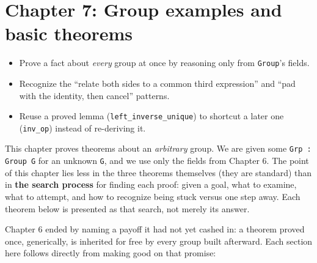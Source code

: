 \chapter{Chapter 7: Group examples and basic theorems}\label{sec:07-group-theorems:00-index:1}

\begin{learningobjectives}
\begin{itemize}
\tightlist
\item
  Prove a fact about \emph{every} group at once by reasoning only from \texttt{Group}'s fields.
\item
  Recognize the ``relate both sides to a common third expression'' and ``pad with the identity, then cancel'' patterns.
\item
  Reuse a proved lemma (\texttt{left\_\allowbreak{}inverse\_\allowbreak{}unique}) to shortcut a later one (\texttt{inv\_\allowbreak{}op}) instead of re-deriving it.
\end{itemize}
\end{learningobjectives}


This chapter proves theorems about an \emph{arbitrary} group. We are given some \texttt{Grp : Group G} for an unknown \texttt{G}, and we use only the fields from Chapter 6. The point of this chapter lies less in the three theorems themselves (they are standard) than in \textbf{the search process} for finding each proof: given a goal, what to examine, what to attempt, and how to recognize being stuck versus one step away. Each theorem below is presented as that search, not merely its answer.

Chapter 6 ended by naming a payoff it had not yet cashed in: a theorem proved once, generically, is inherited for free by every group built afterward. Each section here follows directly from making good on that promise:

